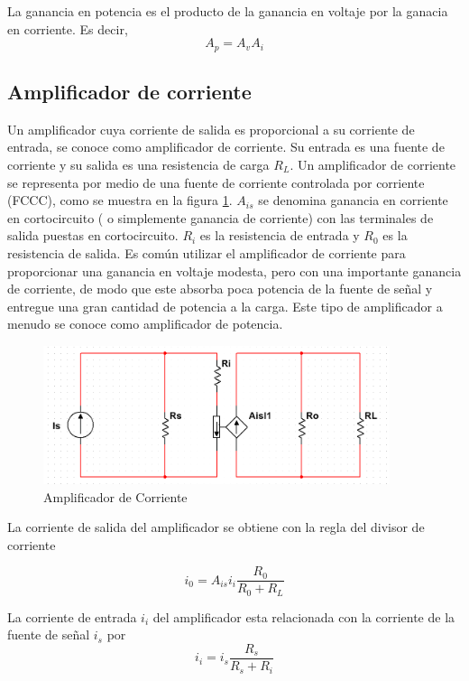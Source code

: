 \documentclass[12pt]{book}
\theoremstyle{definition}
\theoremstyle{remark}
\theoremstyle{plain}
\begin{document}
La ganancia en potencia es el producto de la ganancia en voltaje por la ganacia en corriente. Es decir,
\begin{equation}
\label{equ13}
A_p = A_v A_i
\end{equation}

\subsection{Amplificador de corriente}

Un amplificador cuya corriente de salida es proporcional a su corriente de entrada, se conoce como amplificador de corriente. Su entrada es una fuente de corriente y su salida es una resistencia de carga $R_L$. Un amplificador de corriente se representa por medio de una fuente de corriente controlada por corriente (FCCC), como se muestra en la figura \ref{fig6}. $A_{i s}$ se denomina ganancia en corriente en cortocircuito ( o simplemente ganancia de corriente) con las terminales de salida puestas en cortocircuito. $R_i$ es la resistencia de entrada y $R_0$ es la resistencia de salida. Es común utilizar el amplificador de corriente para proporcionar una ganancia en voltaje modesta, pero con una importante ganancia de corriente, de modo que este absorba poca potencia de la fuente de señal y entregue una gran cantidad de potencia a la carga. Este tipo de amplificador a menudo se conoce como amplificador de potencia.

\begin{figure}
\centering
\includegraphics[width=4in]{amplificadorcorriente.png}
\caption{Amplificador de Corriente}
\label{fig6}
\end{figure}

La corriente de salida del amplificador se obtiene con la regla del divisor de corriente

\begin{equation}
\label{equ14}
i_0 = A_{i s} i_i \frac{R_0}{R_0+R_L}
\end{equation}

La corriente de entrada $i_i$ del amplificador esta relacionada con la corriente de la fuente de señal $i_s$ por
\begin{equation}
\label{equ15}
i_i =  i_s \frac{R_s}{R_s+R_i}
\end{equation}
\end{document}
